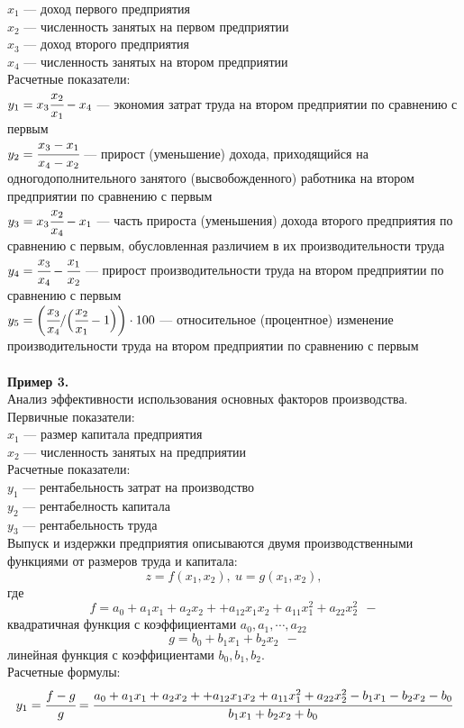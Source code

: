 \documentclass[12pt]{article}
\theoremstyle{definition}
\numberwithin{equation}{section}
\begin{document}
$x_1$ --- доход первого предприятия\\
$x_2$ --- численность занятых на первом предприятии\\
$x_3$ --- доход второго предприятия\\
$x_4$ --- численность занятых на втором предприятии\\
Расчетные показатели:\\
$y_1=x_3\cfrac{x_2}{x_1}-x_4$ --- экономия затрат труда на втором предприятии по сравнению с первым\\
$y_2=\cfrac{x_3-x_1}{x_4-x_2}$ --- прирост (уменьшение) дохода, приходящийся на одногодополнительного занятого (высвобожденного) работника на втором предприятии по сравнению с первым\\
$y_3=x_3\cfrac{x_2}{x_4}-x_1$ --- часть прироста (уменьшения) дохода второго предприятия по сравнению с первым, обусловленная различием в их производительности труда\\
$y_4=\cfrac{x_3}{x_4}-\cfrac{x_1}{x_2}$ --- прирост производительности труда на втором предприятии по сравнению с первым\\
$y_5=\bigg(\cfrac{x_3}{x_4}/\Big(\cfrac{x_2}{x_1}-1\Big)\bigg)\cdot 100$ --- относительное (процентное) изменение производительности труда на втором предприятии по сравнению с первым\\
\\
\textbf{Пример 3.}\\
Анализ эффективности использования основных факторов производства.\\
Первичные показатели:\\
$x_1$ --- размер капитала предприятия\\
$x_2$ --- численность занятых на предприятии\\
Расчетные показатели:\\
$y_1$ --- рентабельность затрат на производство\\
$y_2$ --- рентабелность капитала\\
$y_3$ --- рентабельность труда\\
Выпуск и издержки предприятия описываются двумя производственными функциями от размеров труда и капитала: $$z=f(x_1, x_2),~u=g(x_1, x_2),$$
где $$f=a_0+a_1x_1+a_2x_2++a_{12}x_1x_2+a_{11}x_1^2+a_{22}x_2^2 ~~- $$
квадратичная функция с коэффициентами $a_0, a_1, \cdots, a_{22}$
$$g=b_0+b_1x_1+b_2x_2 ~~- $$
линейная функция с коэффициентами $b_0, b_1, b_2$.\\
Расчетные формулы:\\
$$y_1=\cfrac{f-g}{g}=\cfrac{a_0+a_1x_1+a_2x_2++a_{12}x_1x_2+a_{11}x_1^2+a_{22}x_2^2-b_1x_1-b_2x_2-b_0}{b_1x_1+b_2x_2+b_0}$$
\end{document}
